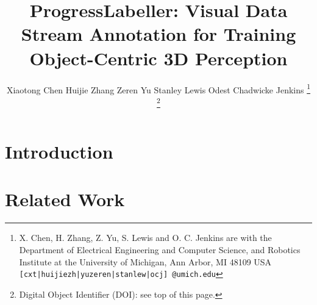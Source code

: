 \documentclass[letterpaper, 10 pt, conference]{ieeeconf}
\begin{document}
\title{\LARGE \bf
ProgressLabeller: Visual Data Stream Annotation for Training Object-Centric 3D Perception
}

\author{Xiaotong Chen\hspace{0.5cm} 
Huijie Zhang\hspace{0.5cm}  Zeren Yu\hspace{0.5cm}  Stanley Lewis\hspace{0.5cm} Odest Chadwicke Jenkins
\thanks{X. Chen, H. Zhang, Z. Yu, S. Lewis and O. C. Jenkins are with the Department of Electrical Engineering and Computer Science, and Robotics Institute at the University of Michigan, Ann
Arbor, MI 48109 USA {\tt\footnotesize [cxt|huijiezh|yuzeren|stanlew|ocj] @umich.edu}}%
\thanks{Digital Object Identifier (DOI): see top of this page.}
}



\maketitle



\section{Introduction}


\section{Related Work}


\end{document}
